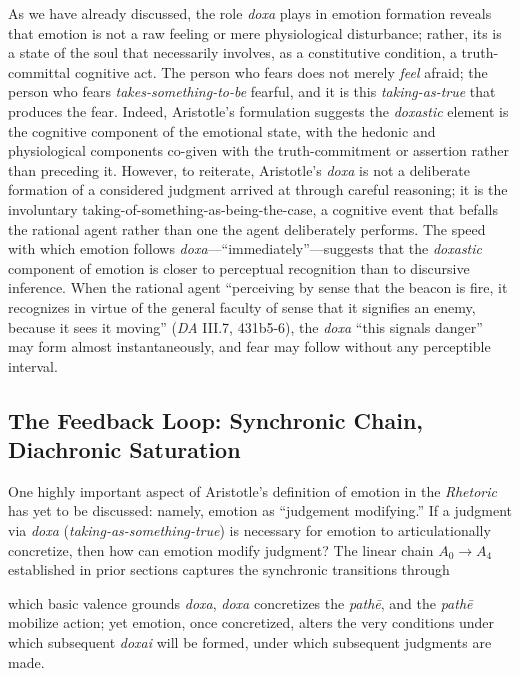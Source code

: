 \documentclass{article}
\begin{document}
As we have already discussed, the role \textit{doxa} plays in emotion formation reveals that emotion is not a raw feeling or mere physiological disturbance; rather, its is a state of the soul that necessarily involves, as a constitutive condition, a truth-committal cognitive act. The  person who fears does not merely \textit{feel} afraid; the person who fears \textit{takes-something-to-be} fearful, and it is this \textit{taking-as-true} that produces the fear. Indeed, Aristotle's formulation suggests the \textit{doxastic} element is the cognitive component of the emotional state, with the hedonic and physiological components co-given with the truth-commitment or assertion rather than preceding it. However, to reiterate, Aristotle's \textit{doxa} is not a deliberate formation of a considered judgment arrived at through careful reasoning; it is the involuntary taking-of-something-as-being-the-case, a cognitive event that befalls the rational agent rather than one the agent deliberately performs. The speed with which emotion follows \textit{doxa}---``immediately''---suggests that the \textit{doxastic} component of emotion is closer to perceptual recognition than to discursive inference. When the rational agent ``perceiving by sense that the beacon is fire, it recognizes in virtue of the general faculty of sense that it signifies an enemy, because it sees it moving'' (\textit{DA} III.7, 431b5-6), the \textit{doxa} ``this signals danger'' may form almost instantaneously, and fear may follow without any perceptible interval. 

\subsection{The Feedback Loop: Synchronic Chain, Diachronic Saturation}

One highly important aspect of Aristotle's definition of emotion in the \textit{Rhetoric} has yet to be discussed: namely, emotion as ``judgement modifying.'' If a judgment via \textit{doxa} (\textit{taking-as-something-true}) is necessary for emotion to articulationally concretize, then how can emotion modify judgment? The linear chain $A_0 \rightarrow A_4$ established in prior sections captures the synchronic transitions through 

which basic valence grounds \textit{doxa}, \textit{doxa} concretizes the \textit{path\=e}, and the \textit{path\=e} mobilize action; yet emotion, once concretized, alters the very conditions under which subsequent \textit{doxai} will be formed, under which subsequent judgments are made. 
\end{document}
